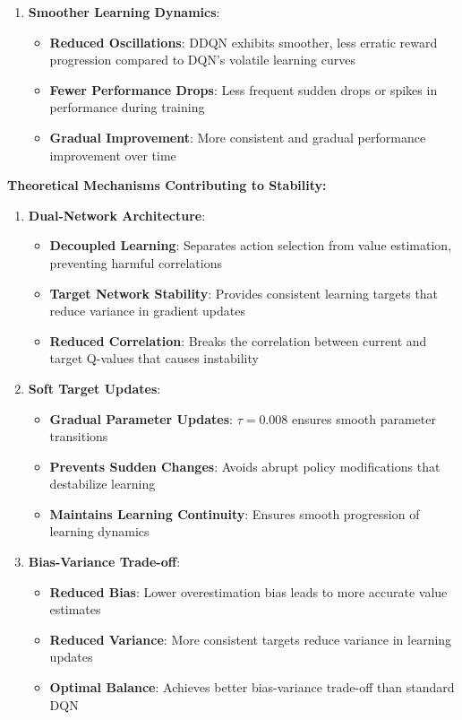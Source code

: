 \documentclass[12pt]{article}
\begin{document}
{{{\begin{enumerate}
    \item \textbf{Smoother Learning Dynamics}:
    \begin{itemize}
        \item \textbf{Reduced Oscillations}: DDQN exhibits smoother, less erratic reward progression compared to DQN's volatile learning curves
        \item \textbf{Fewer Performance Drops}: Less frequent sudden drops or spikes in performance during training
        \item \textbf{Gradual Improvement}: More consistent and gradual performance improvement over time
    \end{itemize}
\end{enumerate}

\textbf{Theoretical Mechanisms Contributing to Stability:}

\begin{enumerate}
    \item \textbf{Dual-Network Architecture}:
    \begin{itemize}
        \item \textbf{Decoupled Learning}: Separates action selection from value estimation, preventing harmful correlations
        \item \textbf{Target Network Stability}: Provides consistent learning targets that reduce variance in gradient updates
        \item \textbf{Reduced Correlation}: Breaks the correlation between current and target Q-values that causes instability
    \end{itemize}
    
    \item \textbf{Soft Target Updates}:
    \begin{itemize}
        \item \textbf{Gradual Parameter Updates}: $\tau = 0.008$ ensures smooth parameter transitions
        \item \textbf{Prevents Sudden Changes}: Avoids abrupt policy modifications that destabilize learning
        \item \textbf{Maintains Learning Continuity}: Ensures smooth progression of learning dynamics
    \end{itemize}
    
    \item \textbf{Bias-Variance Trade-off}:
    \begin{itemize}
        \item \textbf{Reduced Bias}: Lower overestimation bias leads to more accurate value estimates
        \item \textbf{Reduced Variance}: More consistent targets reduce variance in learning updates
        \item \textbf{Optimal Balance}: Achieves better bias-variance trade-off than standard DQN
    \end{itemize}
\end{enumerate}

}}}
\end{document}
